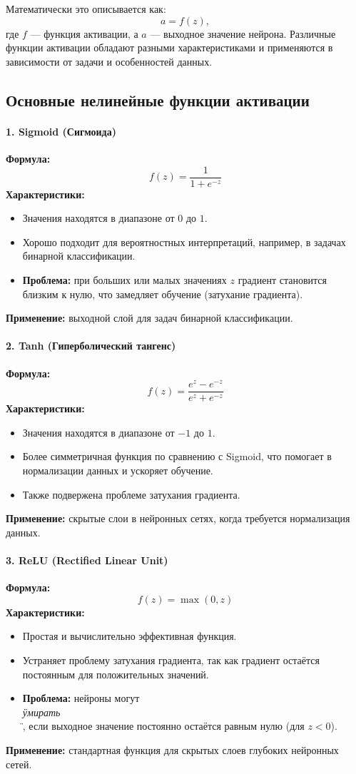 Математически это описывается как:
\[
    a = f(z),
\]
где $f$ — функция активации, а $a$ — выходное значение нейрона. Различные функции активации обладают разными характеристиками и применяются в зависимости от задачи и особенностей данных.

\subsection*{Основные нелинейные функции активации}

\paragraph{1. Sigmoid (Сигмоида)}
\textbf{Формула:}
\[
    f(z) = \frac{1}{1 + e^{-z}}
\]
\textbf{Характеристики:}
\begin{itemize}
    \item Значения находятся в диапазоне от $0$ до $1$.
    \item Хорошо подходит для вероятностных интерпретаций, например, в задачах бинарной классификации.
    \item \textbf{Проблема:} при больших или малых значениях $z$ градиент становится близким к нулю, что замедляет обучение (затухание градиента).
\end{itemize}
\textbf{Применение:} выходной слой для задач бинарной классификации.

\paragraph{2. Tanh (Гиперболический тангенс)}
\textbf{Формула:}
\[
    f(z) = \frac{e^z - e^{-z}}{e^z + e^{-z}}
\]
\textbf{Характеристики:}
\begin{itemize}
    \item Значения находятся в диапазоне от $-1$ до $1$.
    \item Более симметричная функция по сравнению с Sigmoid, что помогает в нормализации данных и ускоряет обучение.
    \item Также подвержена проблеме затухания градиента.
\end{itemize}
\textbf{Применение:} скрытые слои в нейронных сетях, когда требуется нормализация данных.

\paragraph{3. ReLU (Rectified Linear Unit)}
\textbf{Формула:}
\[
    f(z) = \max(0, z)
\]
\textbf{Характеристики:}
\begin{itemize}
    \item Простая и вычислительно эффективная функция.
    \item Устраняет проблему затухания градиента, так как градиент остаётся постоянным для положительных значений.
    \item \textbf{Проблема:} нейроны могут \textit{\\\"умирать\\\"}, если выходное значение постоянно остаётся равным нулю (для $z < 0$).
\end{itemize}
\textbf{Применение:} стандартная функция для скрытых слоев глубоких нейронных сетей.

